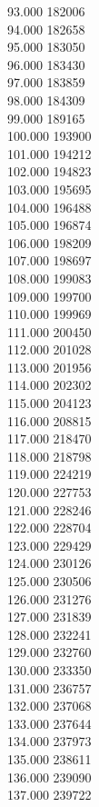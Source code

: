 { 93.000	182006 \\
 94.000	182658 \\
 95.000	183050 \\
 96.000	183430 \\
 97.000	183859 \\
 98.000	184309 \\
 99.000	189165 \\
 100.000	193900 \\
 101.000	194212 \\
 102.000	194823 \\
 103.000	195695 \\
 104.000	196488 \\
 105.000	196874 \\
 106.000	198209 \\
 107.000	198697 \\
 108.000	199083 \\
 109.000	199700 \\
 110.000	199969 \\
 111.000	200450 \\
 112.000	201028 \\
 113.000	201956 \\
 114.000	202302 \\
 115.000	204123 \\
 116.000	208815 \\
 117.000	218470 \\
 118.000	218798 \\
 119.000	224219 \\
 120.000	227753 \\
 121.000	228246 \\
 122.000	228704 \\
 123.000	229429 \\
 124.000	230126 \\
 125.000	230506 \\
 126.000	231276 \\
 127.000	231839 \\
 128.000	232241 \\
 129.000	232760 \\
 130.000	233350 \\
 131.000	236757 \\
 132.000	237068 \\
 133.000	237644 \\
 134.000	237973 \\
 135.000	238611 \\
 136.000	239090 \\
 137.000	239722 \\
}
